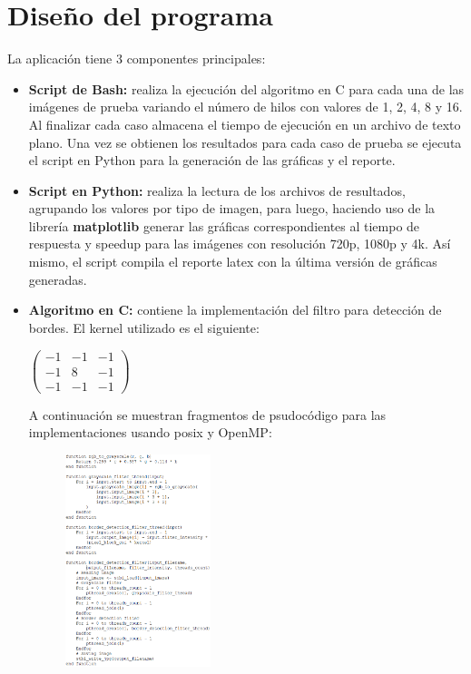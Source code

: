 \section{Diseño del programa}
La aplicación tiene 3 componentes principales:
\begin{itemize}
    \item \textbf{Script de Bash:} realiza la ejecución del algoritmo en C para cada una de las imágenes de prueba variando el número de hilos con valores de 1, 2, 4, 8 y 16. Al finalizar cada caso almacena el tiempo de ejecución en un archivo de texto plano. Una vez se obtienen los resultados para cada caso de prueba se ejecuta el script en Python para la generación de las gráficas y el reporte.
    \item \textbf{Script en Python:} realiza la lectura de los archivos de resultados, agrupando los valores por tipo de imagen, para luego, haciendo uso de la librería \textbf{matplotlib} generar las gráficas correspondientes al tiempo de respuesta y speedup para las imágenes con resolución 720p, 1080p y 4k. Así mismo, el script compila el reporte latex con la última versión de gráficas generadas.
    \item \textbf{Algoritmo en C:} contiene la implementación del filtro para detección de bordes. El kernel utilizado es el siguiente:
    \vspace{6mm}
    \begin{center}
        $\begin{pmatrix}
            -1 & -1 & -1\\
            -1 & 8 & -1\\
            -1 & -1 & -1
        \end{pmatrix}$
    \end{center}
    A continuación se muestran fragmentos de psudocódigo para las implementaciones usando posix y OpenMP:
    \begin{figure}[H]
        \centering
        \includegraphics[width=0.4\textwidth]{../plots/pseudocode.PNG}

\end{figure}
\end{itemize}
